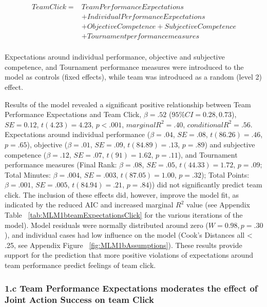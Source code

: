 \begin{equation}
  \begin{align*}
    Team Click =  & Team Performance Expectations \\
              &+ Individual Performance Expectations \\
              &+ Objective Competence + Subjective Competence \\
              &+ Tournament performance measures \\
  \end{align*}
\end{equation}

Expectations around individual performance, objective and subjective competence, and Tournament performance measures were introduced to the model as controls (fixed effects), while team was introduced as a random (level 2) effect.

Results of the model revealed a significant positive relationship between Team Performance Expectations and Team Click, $\beta = .52$ ($95\% CI =  0.28, 0.73$), $SE = 0.12$, $t(4.23) = 4.23$, $p < .001$, $marginal R^2 = .40$, $conditional R^2 = .56$.
Expectations around individual performance ($\beta = .04$, $SE = .08$, $t(86.26) = .46$, $p = .65$), objective ($\beta = .01$, $SE = .09$, $t(84.89) = .13$, $p = .89$) and subjective competence ($\beta = .12$, $SE = .07$, $t(91) = 1.62$, $p = .11$), and Tournament performance measures (Final Rank: $\beta = .08$, $SE = .05$, $t(44.33) = 1.72$, $p = .09$;
Total Minutes: $\beta = .004$, $SE = .003$, $t(87.05) = 1.00$, $p = .32$); Total Points: $\beta = .001$, $SE = .005$, $t(84.94) = .21$, $p = .84$)) did not significantly predict team click.  The inclusion of these effects did, however, improve the model fit, as indicated by the reduced AIC and increased marginal $R^2$ value (see Appendix Table ~\ref{tab:MLM1bteamExpectationsClick} for the various iterations of the model).  Model residuals were normally distributed around zero ($W = 0.98, p = .30$), and individual cases had low influence on the model (Cook's Distances all < .25, see Appendix Figure ~\ref{fig:MLM1bAssumptions}).  These results provide support for the prediction that more positive violations of expectations around team performance predict feelings of team click.




\subsubsection{1.c Team Performance Expectations moderates the effect of Joint Action Success on team Click}

